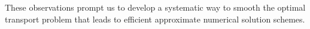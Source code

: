 \documentclass[11pt, a4paper, oneside, reqno]{article}
\begin{document}
	These observations prompt us to develop a systematic way to smooth the optimal transport problem that leads to efficient approximate numerical solution schemes. 
\end{document}
